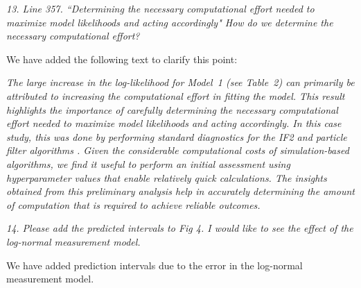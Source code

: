 \documentclass[11pt]{article}
\newcommand\report[1]{{\color{mygreen} \vspace{1mm}\hspace{0.25in}\parbox{6in}{\em #1}}}
\newcommand\article[1]{{\color{blue} \vspace{1mm}\hspace{0.25in}\parbox{6in}{\em #1}}}
\begin{document}
\report{
  13. Line 357. ``Determining the necessary computational effort needed to maximize model likelihoods and acting accordingly" How do we determine the necessary computational effort?
}

We have added the following text to clarify this point: 

\article{The large increase in the log-likelihood for Model~1 (see Table~2) can primarily be attributed to increasing the computational effort in fitting the model.
This result highlights the importance of carefully determining the necessary computational effort needed to maximize model likelihoods and acting accordingly.
In this case study, this was done by performing standard diagnostics for the IF2 and particle filter algorithms \cite{king16}. Given the considerable computational costs of simulation-based algorithms, we find it useful to perform an initial assessment using hyperparameter values that enable relatively quick calculations. The insights obtained from this preliminary analysis help in accurately determining the amount of computation that is required to achieve reliable outcomes.}

\report{
  14. Please add the predicted intervals to Fig 4. I would like to see the effect of the log-normal measurement model.
}

We have added prediction intervals due to the error in the log-normal measurement model. 
\end{document}

